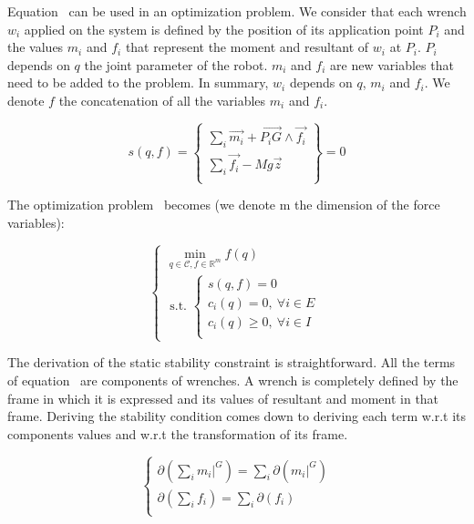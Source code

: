 Equation~ can be used in an optimization problem.
We consider that each wrench $w_i$ applied on the system is defined by the position of its application point $P_i$ and the values $m_i$ and $f_i$ that represent the moment and resultant of $w_i$ at $P_i$.
$P_i$ depends on $q$ the joint parameter of the robot.
$m_i$ and $f_i$ are new variables that need to be added to the problem.
In summary, $w_i$ depends on $q$, $m_i$ and $f_i$.
We denote $f$ the concatenation of all the variables $m_i$ and $f_i$.

\begin{equation}
  \boxed{s(q,f) = \left\{
  \begin{array}{r}
    \sum\limits_i \vec{m_i} + \overrightarrow{P_i G}\wedge \vec{f_i} \\
    \sum\limits_i \vec{f_i} - Mg\vec{z} \\
  \end{array}
  \right\}
  = 0}
\end{equation}

The optimization problem~ becomes (we denote m the dimension of the force variables):

\begin{equation}
\label{eq:optim_form_PG_with_stab}
  \left\{
  \begin{array}{l}
    \min\limits_{q\in\mathcal{C}, f\in \mathbb{R}^m}{f(q)}\\
    \text{ s.t. }
    \left\{
    \begin{array}{l}
      s(q,f) = 0\\
      c_i(q) = 0,\ \forall i\in{E}\\
      c_i(q) \geq 0,\ \forall i\in{I}\\
    \end{array}
    \right.
  \end{array}
  \right.
\end{equation}

The derivation of the static stability constraint is straightforward.
All the terms of equation~ are components of wrenches.
A wrench is completely defined by the frame in which it is expressed and its values of resultant and moment in that frame.
Deriving the stability condition comes down to deriving each term w.r.t its components values and w.r.t the transformation of its frame.

\begin{equation}
\left\{
\begin{array}{r}
  \partial\left(\sum\limits_i m_i|^G\right) = \sum\limits_i \partial(m_i|^G) \\
  \partial\left(\sum\limits_i f_i\right) = \sum\limits_i \partial(f_i) \\
\end{array}
\right.
\label{eq:derivation_stability}
\end{equation}

